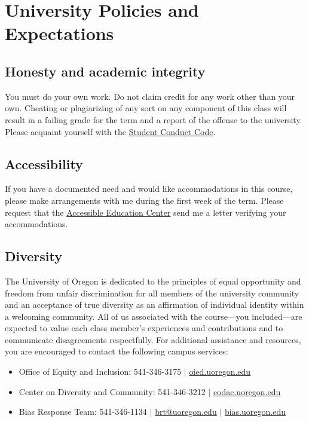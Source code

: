\documentclass[10pt]{article}
\begin{document}
\section*{University Policies and Expectations}

\subsection*{Honesty and academic integrity}
You must do your own work. Do not claim credit for any work other than your own. Cheating or plagiarizing of any sort on any component of this class will result in a failing grade for the term and a report of the offense to the university. Please acquaint yourself with the \href{http://studentlife.uoregon.edu}{Student Conduct Code}.

\subsection*{Accessibility}

If you have a documented need and would like accommodations in this course, please make arrangements with me during the first week of the term. Please request that the \href{https://aec.uoregon.edu/}{Accessible Education Center} send me a letter verifying your accommodations.

\subsection*{Diversity}

The University of Oregon is dedicated to the principles of equal opportunity and freedom from unfair discrimination for all members of the university community and an acceptance of true diversity as an affirmation of individual identity within a welcoming community. All of us associated with the course---you included---are expected to value each class member's experiences and contributions and to communicate disagreements respectfully. For additional assistance and resources, you are encouraged to contact the following campus services:
\begin{itemize}
	\item Office of Equity and Inclusion: 541-346-3175 $\vert$ \href{oied.uoregon.edu}{oied.uoregon.edu}
	\item Center on Diversity and Community: 541-346-3212 $\vert$ \href{codac.uoregon.edu}{codac.uoregon.edu}
	\item Bias Response Team: 541-346-1134 $\vert$ \href{mailto:brt@uoregon.edu}{brt@uoregon.edu} $\vert$ \href{bias.uoregon.edu}{bias.uoregon.edu}
\end{itemize}
\end{document}
